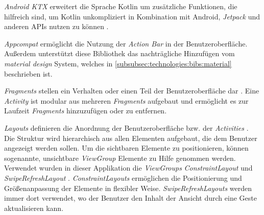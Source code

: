 \documentclass[a4paper]{article}
\begin{document}
\textit{Android KTX} erweitert die Sprache Kotlin um zusätzliche Funktionen, die hilfreich sind, um Kotlin unkompliziert in Kombination mit Android, \textit{Jetpack} und anderen APIs nutzen zu können \autocite{android_ktx}.

\textit{Appcompat} \autocite{android_appcompat} ermöglicht die Nutzung der \textit{Action Bar} \autocite{android_action_bar} in der Benutzeroberfläche.
Außerdem unterstützt diese Bibliothek das nachträgliche Hinzufügen vom \textit{material design} System, welches in \autoref{subsubsec:technologies:bibs:material} beschrieben ist.

\textit{Fragments} stellen ein Verhalten oder einen Teil der Benutzeroberfläche dar \autocite{android_fragments}.
Eine \textit{Activity} ist modular aus mehreren \textit{Fragments} aufgebaut und ermöglicht es zur Laufzeit \textit{Fragments} hinzuzufügen oder zu entfernen.

\textit{Layouts} definieren die Anordnung der Benutzeroberfläche bzw. der \textit{Activities} \autocite{android_layouts}.
Die Struktur wird hierarchisch aus allen Elementen aufgebaut, die dem Benutzer angezeigt werden sollen.
Um die sichtbaren Elemente zu positionieren, können sogenannte, unsichtbare \textit{ViewGroup} Elemente zu Hilfe genommen werden.
Verwendet wurden in dieser Applikation die \textit{ViewGroups} \textit{ConstraintLayout} \autocite{android_constraintlayout} und \textit{SwipeRefreshLayout} \autocite{android_swiperefreshlayout}.
\textit{ConstraintLayouts} ermöglichen die Positionierung und Größenanpassung der Elemente in flexibler Weise.
\textit{SwipeRefreshLayouts} werden immer dort verwendet, wo der Benutzer den Inhalt der Ansicht durch eine Geste aktualisieren kann.
\end{document}
